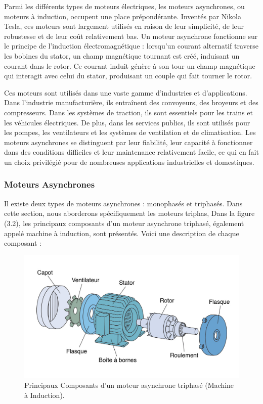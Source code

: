 Parmi les différents types de moteurs électriques, les moteurs asynchrones, ou
moteurs à induction, occupent une place prépondérante. Inventés par Nikola
Tesla, ces moteurs sont largement utilisés en raison de leur simplicité, de
leur robustesse et de leur coût relativement bas. Un moteur asynchrone
fonctionne sur le principe de l'induction électromagnétique : lorsqu'un courant
alternatif traverse les bobines du stator, un champ magnétique tournant est
créé, induisant un courant dans le rotor. Ce courant induit génère à son tour
un champ magnétique qui interagit avec celui du stator, produisant un couple
qui fait tourner le rotor.

Ces moteurs sont utilisés dans une vaste gamme d'industries et d'applications.
Dans l'industrie manufacturière, ils entraînent des convoyeurs, des broyeurs et
des compresseurs. Dans les systèmes de traction, ils sont essentiels pour les
trains et les véhicules électriques. De plus, dans les services publics, ils
sont utilisés pour les pompes, les ventilateurs et les systèmes de ventilation
et de climatisation. Les moteurs asynchrones se distinguent par leur fiabilité,
leur capacité à fonctionner dans des conditions difficiles et leur maintenance
relativement facile, ce qui en fait un choix privilégié pour de nombreuses
applications industrielles et domestiques.

\subsubsection{Moteurs Asynchrones}

Il existe deux types de moteurs asynchrones : monophasés et triphasés. Dans
cette section, nous aborderons spécifiquement les moteurs triphas, Dans la
figure (3.2), les principaux composants d'un moteur asynchrone triphasé,
également appelé machine à induction, sont présentés. Voici une description de
chaque composant :

\begin{figure}[hbt!]
	\centering
	\includegraphics[width=12cm]{images_pfe/motor.jpg}
	\caption{
		Principaux Composants d'un moteur asynchrone triphasé (Machine à Induction).}
	\label{fig:moteu-asynchrone}
\end{figure}
\FloatBarrier

